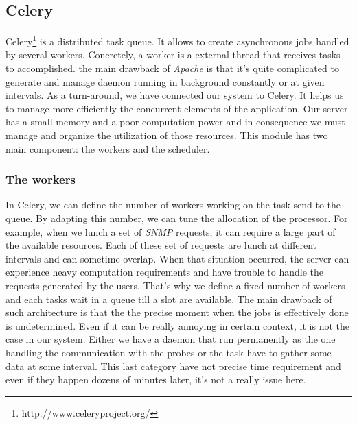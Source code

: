 \subsection{Celery}
Celery\footnote{http://www.celeryproject.org/} is a distributed task queue. It allows to create asynchronous jobs handled by several workers. Concretely, a worker is a external thread that receives tasks to accomplished. the main drawback of \emph{Apache} is that it's quite complicated to generate and manage daemon running in background constantly or at given intervals. As a turn-around, we have connected our system to Celery. It helps us to manage more efficiently the concurrent elements of the application. Our server has a small memory and a poor computation power and in consequence we must manage and organize the utilization of those resources. This module has two main component: the workers and the scheduler.

\subsubsection*{The workers}
In Celery, we can define the number of workers working on the task send to the queue. By adapting this number, we can tune the allocation of the processor. For example, when we lunch a set of \emph{SNMP} requests, it can require a large part of the available resources. Each of these set of requests are lunch at different intervals and can sometime overlap. When that situation occurred, the server can experience heavy computation requirements and have trouble to handle the requests generated by the users. That's why we define a fixed number of workers and each tasks wait in a queue till a slot are available. The main drawback of such architecture is that the the precise moment when the jobs is effectively done is undetermined. Even if it can be really annoying in certain context, it is not the case in our system. Either we have a daemon that run permanently as the one handling the communication with the probes or the task have to gather some data at some interval. This last category have not precise time requirement and even if they happen dozens of minutes later, it's not a really issue here.

